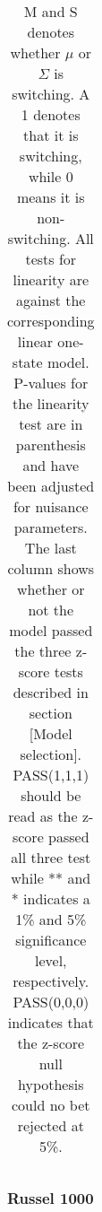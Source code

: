 \documentclass[11pt,a4paper,oneside]{article}
\begin{document}
\begin{table}[h!]
\begin{tabular}{lrrrrrrrr}
\bottomrule
\end{tabular}
\caption*{M and S denotes whether $\mu$ or $\Sigma$ is switching. A 1 denotes that it is switching, while 0 means it is non-switching. All tests for linearity are against the corresponding linear one-state model. P-values for the linearity test are in parenthesis and have been adjusted for nuisance parameters. The last column shows whether or not the model passed the three z-score tests described in section [Model selection]. PASS(1,1,1) should be read as the z-score passed all three test while ** and * indicates a 1\% and 5\% significance level, respectively. PASS(0,0,0) indicates that the z-score null hypothesis could no bet rejected at 5\%.}
\vspace{-20mm}
\end{table}


\newpage
{}
\recalctypearea





\subsubsection*{Russel 1000}





\newpage
{}
\recalctypearea
\end{document}
